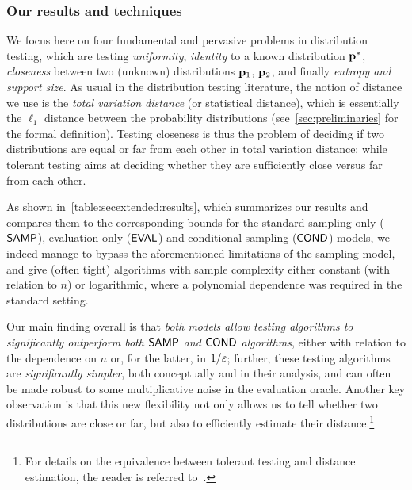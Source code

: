       \subsubsection{Our results and techniques}
  We focus here on four fundamental and pervasive problems in distribution testing, which are testing \emph{uniformity}, \emph{identity} to a known distribution $\mathbf{p}^\ast$, \emph{closeness} between two (unknown) distributions $\mathbf{p}_1$, $\mathbf{p}_2$, and finally \emph{entropy and support size}. As usual in the distribution testing literature, the notion of distance we use is the \emph{total variation distance} (or statistical distance), which is essentially the $\ell_1$ distance between the probability distributions (see~\cref{sec:preliminaries} for the formal definition). Testing closeness is thus the problem of deciding if two distributions are equal or far from each other in total variation distance; while tolerant testing aims at deciding whether they are sufficiently close versus far from each other.
    
  As shown in~\cref{table:secextended:results}, which summarizes our results and compares them to the corresponding bounds for the standard sampling-only (${\sf SAMP}$), evaluation-only (${\sf EVAL}$) and conditional sampling (${\sf COND}$) models, we indeed manage to bypass the aforementioned limitations of the sampling model, and give (often tight) algorithms with sample complexity either constant (with relation to $n$) or logarithmic, where a polynomial dependence was required in the standard setting.
  
  Our main finding overall is that \emph{both \pdfsamp models allow testing algorithms to significantly outperform both ${\sf SAMP}$ and ${\sf COND}$ algorithms}, either with relation to the dependence on $n$ or, for the latter, in $1/\varepsilon$; further, these testing algorithms are \emph{significantly simpler}, both conceptually and in their analysis, and can often be made robust to some multiplicative noise in the evaluation oracle. Another key observation is that this new flexibility not only allows us to tell whether two distributions are close or far, but also to efficiently estimate their distance.\footnote{For details on the equivalence between tolerant testing and distance estimation, the reader is referred to~\cite{PRR:06}.}
  
